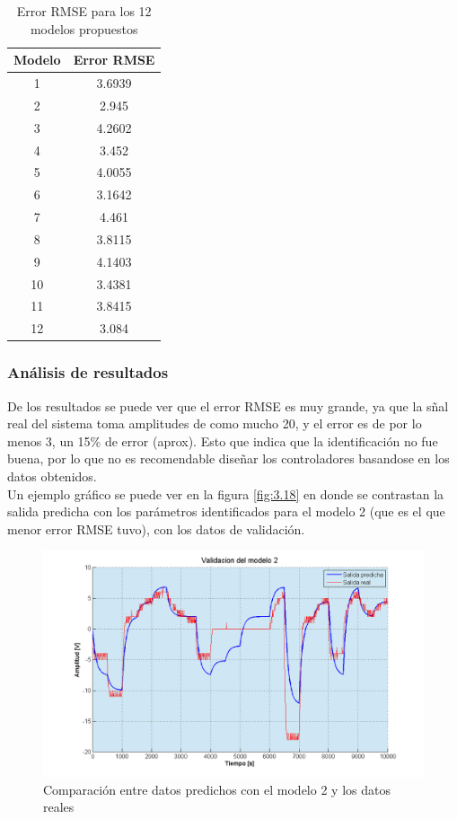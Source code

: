 \begin{table}[!ht]
	\begin{center}
		
		\begin{tabular}{|c|c|}
			\hline
			\rowcolor{OODlightblue}
			Modelo & Error RMSE   \\
			\hline \hline
			1 & 3.6939 \\
			\hline
			2 & 2.945 \\
			\hline
			3 & 4.2602  \\
			\hline
			4 & 3.452  \\
			\hline
			5 & 4.0055 \\
			\hline
			6 & 3.1642 \\
			\hline
			7 & 4.461 \\
			\hline
			8 & 3.8115 \\
			\hline
			9 & 4.1403 \\
			\hline
			10 & 3.4381 \\
			\hline
			11 & 3.8415 \\
			\hline
			12 & 3.084 \\
			\hline
		\end{tabular}
	\end{center}
	\caption{Error RMSE para los 12 modelos propuestos}
	\label{table:\thetable}
\end{table}

\subsubsection{Análisis de resultados}
De los resultados se puede ver que el error RMSE es muy grande, ya que la sñal real del sistema toma amplitudes de como mucho 20, y el error es de por lo menos 3, un 15\% de error (aprox). Esto que indica que la identificación no fue buena, por lo que no es recomendable diseñar los controladores basandose en los datos obtenidos. \\
Un ejemplo gráfico se puede ver en la figura \ref{fig:3.18} en donde se contrastan la salida predicha con los parámetros identificados para el modelo 2 (que es el que menor error RMSE tuvo), con los datos de validación.

\begin{figure}[!ht]
	\centering
	\includegraphics[width=15cm,scale=1]{resources/3_18-identVsValid.png}
	\caption{Comparación entre datos predichos con el modelo 2 y los datos reales}
	\label{fig:\thefigure}
\end{figure}


